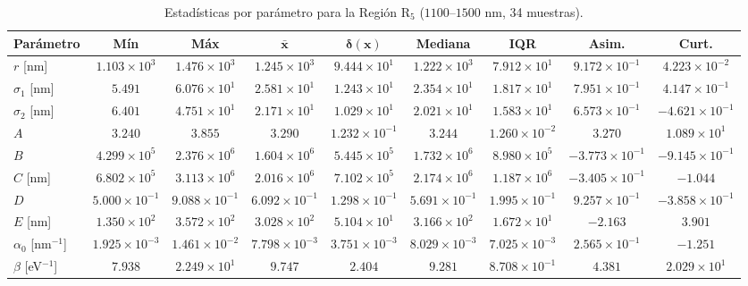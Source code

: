 \documentclass{article}
\begin{document}
\begin{table}[htbp]
\centering
\caption{Estad\'isticas por par\'ametro para la Regi\'on R$_5$ ($1100$--$1500$ nm, 34 muestras).}
\label{tab:bin4}
\begin{tabular}{@{}lcccccccc@{}} %
\toprule
\textbf{Par\'ametro} & \textbf{M\'in} & \textbf{M\'ax} & $\boldsymbol{\bar{x}}$ & $\boldsymbol{\delta(x)}$ & \textbf{Mediana} & \textbf{IQR} & \textbf{Asim.} & \textbf{Curt.} \\
\midrule
$r$ [nm] & $1.103 \times 10^3$ & $1.476 \times 10^3$ & $1.245 \times 10^3$ & $9.444 \times 10^1$ & $1.222 \times 10^3$ & $7.912 \times 10^1$ & $9.172 \times 10^{-1}$ & $4.223 \times 10^{-2}$ \\
$\sigma_{1}$ [nm] & $5.491$ & $6.076 \times 10^1$ & $2.581 \times 10^1$ & $1.243 \times 10^1$ & $2.354 \times 10^1$ & $1.817 \times 10^1$ & $7.951 \times 10^{-1}$ & $4.147 \times 10^{-1}$ \\
$\sigma_{2}$ [nm] & $6.401$ & $4.751 \times 10^1$ & $2.171 \times 10^1$ & $1.029 \times 10^1$ & $2.021 \times 10^1$ & $1.583 \times 10^1$ & $6.573 \times 10^{-1}$ & $-4.621 \times 10^{-1}$ \\
$A$ & $3.240$ & $3.855$ & $3.290$ & $1.232 \times 10^{-1}$ & $3.244$ & $1.260 \times 10^{-2}$ & $3.270$ & $1.089 \times 10^1$ \\
$B$ & $4.299 \times 10^5$ & $2.376 \times 10^6$ & $1.604 \times 10^6$ & $5.445 \times 10^5$ & $1.732 \times 10^6$ & $8.980 \times 10^5$ & $-3.773 \times 10^{-1}$ & $-9.145 \times 10^{-1}$ \\
$C$ [nm] & $6.802 \times 10^5$ & $3.113 \times 10^6$ & $2.016 \times 10^6$ & $7.102 \times 10^5$ & $2.174 \times 10^6$ & $1.187 \times 10^6$ & $-3.405 \times 10^{-1}$ & $-1.044$ \\
$D$ & $5.000 \times 10^{-1}$ & $9.088 \times 10^{-1}$ & $6.092 \times 10^{-1}$ & $1.298 \times 10^{-1}$ & $5.691 \times 10^{-1}$ & $1.995 \times 10^{-1}$ & $9.257 \times 10^{-1}$ & $-3.858 \times 10^{-1}$ \\
$E$ [nm] & $1.350 \times 10^2$ & $3.572 \times 10^2$ & $3.028 \times 10^2$ & $5.104 \times 10^1$ & $3.166 \times 10^2$ & $1.672 \times 10^1$ & $-2.163$ & $3.901$ \\
$\alpha_{0}$ [nm$^{-1}$] & $1.925 \times 10^{-3}$ & $1.461 \times 10^{-2}$ & $7.798 \times 10^{-3}$ & $3.751 \times 10^{-3}$ & $8.029 \times 10^{-3}$ & $7.025 \times 10^{-3}$ & $2.565 \times 10^{-1}$ & $-1.251$ \\
$\beta$ [eV$^{-1}$] & $7.938$ & $2.249 \times 10^1$ & $9.747$ & $2.404$ & $9.281$ & $8.708 \times 10^{-1}$ & $4.381$ & $2.029 \times 10^1$ \\

\end{tabular}
\end{table}
\end{document}
